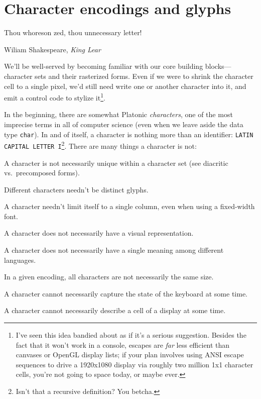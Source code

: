 \section{Character encodings and glyphs}\label{section:unicode}
\label{sec:charsets}
\epigraph{Thou whoreson zed, thou unnecessary letter!}{Wiliam Shakespeare, \textit{King Lear}}

We'll be well-served by becoming familiar with our core building
blocks---character sets and their rasterized forms. Even if we were to shrink
the character cell to a single pixel, we'd still need write one or another
character into it, and emit a control code to stylize it\footnote{I've seen
this idea bandied about as if it's a serious suggestion. Besides the fact
that it won't work in a console, escapes are \textit{far} less efficient than
canvases or OpenGL display lists; if your plan involves using ANSI escape
sequences to drive a 1920x1080 display via roughly two million 1x1 character
cells, you're not going to space today, or maybe ever\cite{upgoerfive}.}.

In the beginning, there are somewhat Platonic \textit{characters}, one of the
most imprecise terms in all of computer science (even when we leave aside the
data type \texttt{char}). In and of itself, a character is nothing more than an
identifier: \texttt{LATIN CAPITAL LETTER I}\footnote{Isn't that a recursive
definition? You betcha.}. There are many things a character is not:

\begin{denseitemize}
\item{A character is not necessarily unique within a character set (see diacritic vs.\ precomposed forms).}
\item{Different characters needn't be distinct glyphs\cite{nothinggoesaway}.}
\item{A character needn't limit itself to a single column, even when using a fixed-width font.}
\item{A character does not necessarily have a visual representation.}
\item{A character does not necessarily have a single meaning among different languages.}
\item{In a given encoding, all characters are not necessarily the same size.}
\item{A character cannot necessarily capture the state of the keyboard at some time.}
\item{A character cannot necessarily describe a cell of a display at some time.}
\end{denseitemize}

